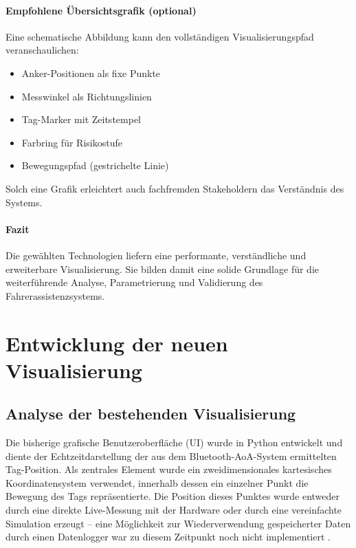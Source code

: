 \documentclass[a4paper, 12pt]{article} %
\begin{document}
\paragraph{Empfohlene Übersichtsgrafik (optional)}

Eine schematische Abbildung kann den vollständigen Visualisierungs­pfad veranschaulichen:

\begin{itemize}[leftmargin=2em]
  \item Anker-Positionen als fixe Punkte  
  \item Messwinkel als Richtungslinien  
  \item Tag-Marker mit Zeitstempel  
  \item Farbring für Risikostufe  
  \item Bewegungspfad (gestrichelte Linie)
\end{itemize}

Solch eine Grafik erleichtert auch fachfremden Stakeholdern das Verständnis des Systems.

\paragraph{Fazit}

Die gewählten Technologien liefern eine performante, verständliche und erweiterbare Visualisierung.  
Sie bilden damit eine solide Grundlage für die weiterführende Analyse, Parametrierung und Validierung des Fahrerassistenzsystems.

\clearpage


\section{Entwicklung der neuen Visualisierung}
\subsection{Analyse der bestehenden Visualisierung}

Die bisherige grafische Benutzeroberfläche (\ac{UI}) wurde in Python entwickelt und diente der Echtzeitdarstellung der aus dem Bluetooth-\ac{AoA}-System ermittelten
Tag-Position. Als zentrales Element wurde ein zweidimensionales kartesisches Koordinatensystem verwendet, innerhalb dessen ein einzelner Punkt die 
Bewegung des Tags repräsentierte. Die Position dieses Punktes wurde entweder durch eine direkte Live-Messung mit der Hardware oder durch eine 
vereinfachte Simulation erzeugt – eine Möglichkeit zur Wiederverwendung gespeicherter Daten durch einen Datenlogger war zu diesem Zeitpunkt noch nicht
implementiert \cite{tkinter_book}.
\end{document}
